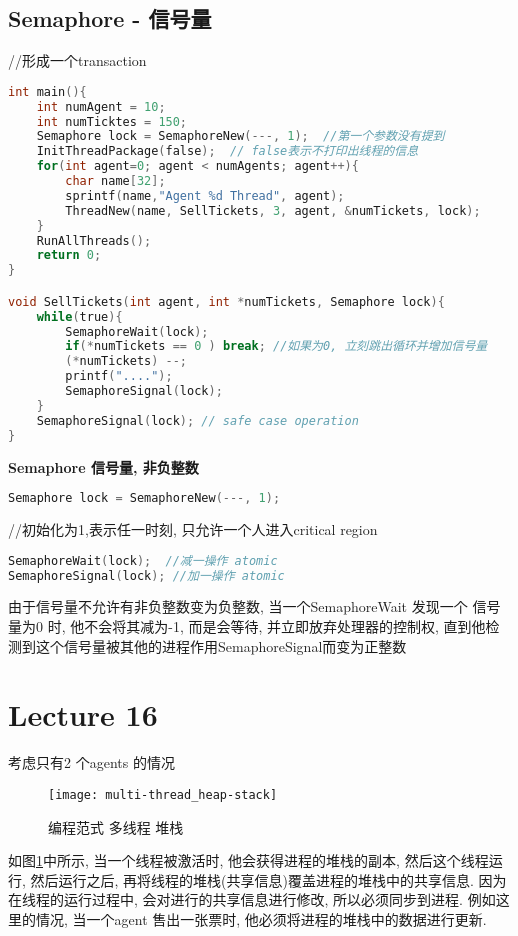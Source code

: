 \documentclass{article}
\begin{document}
\subsection{Semaphore - 信号量}
//形成一个transaction
\begin{lstlisting}[language = C]
int main(){
	int numAgent = 10;
	int numTicktes = 150;
	Semaphore lock = SemaphoreNew(---, 1);  //第一个参数没有提到
	InitThreadPackage(false);  // false表示不打印出线程的信息
	for(int agent=0; agent < numAgents; agent++){
		char name[32];
		sprintf(name,"Agent %d Thread", agent);
		ThreadNew(name, SellTickets, 3, agent, &numTickets, lock);
	}
	RunAllThreads();
	return 0;
}

void SellTickets(int agent, int *numTickets, Semaphore lock){
	while(true){
		SemaphoreWait(lock);
		if(*numTickets == 0 ) break; //如果为0, 立刻跳出循环并增加信号量
		(*numTickets) --;
		printf("....");
		SemaphoreSignal(lock);
	}
	SemaphoreSignal(lock); // safe case operation
}
\end{lstlisting}

\textbf{Semaphore 信号量, 非负整数}
\begin{lstlisting}[language = C]
Semaphore lock = SemaphoreNew(---, 1);
\end{lstlisting}
//初始化为1,表示任一时刻, 只允许一个人进入critical region

\begin{lstlisting}[language = C]
SemaphoreWait(lock);  //减一操作 atomic
SemaphoreSignal(lock); //加一操作 atomic
\end{lstlisting}
由于信号量不允许有非负整数变为负整数, 当一个SemaphoreWait 发现一个 信号量为0 时, 他不会将其减为-1, 而是会等待, 并立即放弃处理器的控制权, 直到他检测到这个信号量被其他的进程作用SemaphoreSignal而变为正整数

\section{Lecture 16}
考虑只有2 个agents 的情况
\begin{figure}[htbp]
	\centering
	\texttt{[image: multi-thread\_heap-stack]}\\
	\caption{编程范式 多线程 堆栈}\label{fig.multi-thread.heap-stack}
\end{figure}

如图\ref{fig.multi-thread.heap-stack}中所示, 当一个线程被激活时, 他会获得进程的堆栈的副本, 然后这个线程运行, 然后运行之后, 再将线程的堆栈(共享信息)覆盖进程的堆栈中的共享信息.
因为在线程的运行过程中, 会对进行的共享信息进行修改, 所以必须同步到进程.
例如这里的情况, 当一个agent 售出一张票时, 他必须将进程的堆栈中的数据进行更新.
\end{document}
